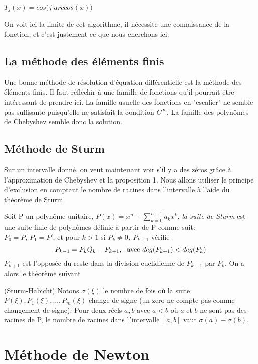 \documentclass[a4paper,10.5pt]{article}
\begin{document}
	\noindent $T_{j}(x)=cos(j$  $arccos(x))$
	
	\noindent On voit ici la limite de cet algorithme, il nécessite une connaissance de la fonction, et c'est justement ce que nous cherchons ici.
	
	\subsection{La méthode des éléments finis}
	
	Une bonne méthode de résolution d'équation différentielle est la méthode des éléments finis. Il faut réfléchir à une famille de fonctions qu'il pourrait-être intéressant de prendre ici. La famille usuelle des fonctions en "escalier" ne semble pas suffisante puisqu'elle ne satisfait la condition $C^{\infty}$.
	La famille des polynômes de Chebyshev semble donc la solution.
	
	\subsection{Méthode de Sturm}
	
	Sur un intervalle donné, on veut maintenant voir s'il y a des zéros grâce à l'approximation de Chebyshev et la proposition 1. Nous allons utiliser le principe d'exclusion en comptant le nombre de racines dans l'intervalle à l'aide du théorème de Sturm.
	
	
	Soit P un polynôme unitaire, $P(x)=x^{n} + \sum^{n-1}_{k=0}a_{k}x^{k}$, \textit {la suite de Sturm} est une suite finie de polynômes définie à partir de P comme suit:\\
	$P_{0}=P$, $P_{1}=P'$, et pour $k > 1$ si $P_{k} \neq 0$,  $P_{k+1}$ vérifie
	\[P_{k-1}=P_{k}Q_{k}-P_{k+1},\hspace{2mm}\text{avec }    deg(P_{k+1})<deg(P_{k})\] 
	$P_{k+1}$ est l'opposée du reste dans la division euclidienne de $P_{k-1}$ par $P_{k}$. On a alors le théorème suivant 
	

	\begin{theorem}(Sturm-Habicht)
		Notons $\sigma(\xi)$ le nombre de fois où la suite $P(\xi),P_{1}(\xi),...,P_{m}(\xi)$ change de signe (un zéro ne compte pas comme changement de signe).
		Pour deux réels $a,b$ avec $a<b$ où $a$ et $b$ ne sont pas des racines de P, le nombre de racines dans l'intervalle $[a,b]$ vaut
		$\sigma(a)-\sigma(b)$.
	\end{theorem}
	
	\section{Méthode de Newton}
	
\end{document}
